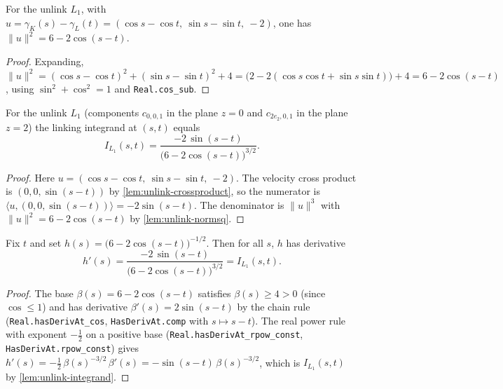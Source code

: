\begin{lemma}
    \label{lem:unlink-normsq}
    For the unlink $L_1$, with $u=\gamma_K(s)-\gamma_L(t)=(\cos s-\cos t,\ \sin
    s-\sin t,\ -2)$, one has $\lVert u\rVert^2 = 6 - 2\cos(s-t)$.
\end{lemma}
\begin{proof}
    Expanding, $\lVert u\rVert^2 = (\cos s-\cos t)^2 + (\sin s-\sin t)^2 + 4
    = \bigl(2 - 2(\cos s\cos t+\sin s\sin t)\bigr) + 4 = 6 - 2\cos(s-t)$, using
    $\sin^2+\cos^2=1$ and \texttt{Real.cos\_sub}.
\end{proof}

\begin{lemma}
    \label{lem:unlink-integrand}
    For the unlink $L_1$ (components $c_{0,0,1}$ in the plane $z=0$ and
    $c_{2e_2,0,1}$ in the plane $z=2$) the linking integrand at $(s,t)$ equals
    \[
        I_{L_1}(s,t) = \frac{-2\,\sin(s-t)}{\bigl(6 - 2\cos(s-t)\bigr)^{3/2}} .
    \]
\end{lemma}
\begin{proof}
    Here $u = (\cos s-\cos t,\ \sin s-\sin t,\ -2)$. The velocity cross product is
    $(0,0,\sin(s-t))$ by \cref{lem:unlink-crossproduct}, so the numerator is
    $\langle u,(0,0,\sin(s-t))\rangle = -2\sin(s-t)$. The denominator is
    $\lVert u\rVert^3$ with $\lVert u\rVert^2 = 6-2\cos(s-t)$ by
    \cref{lem:unlink-normsq}.
\end{proof}

\begin{lemma}
    \label{lem:unlink-antideriv}
    Fix $t$ and set $h(s) = \bigl(6-2\cos(s-t)\bigr)^{-1/2}$. Then for all $s$, $h$
    has derivative
    \[
        h'(s) = \frac{-2\,\sin(s-t)}{\bigl(6-2\cos(s-t)\bigr)^{3/2}} = I_{L_1}(s,t).
    \]
\end{lemma}
\begin{proof}
    The base $\beta(s)=6-2\cos(s-t)$ satisfies $\beta(s)\ge4>0$ (since
    $\cos\le1$) and has derivative $\beta'(s)=2\sin(s-t)$ by the chain rule
    (\texttt{Real.hasDerivAt\_cos}, \texttt{HasDerivAt.comp} with $s\mapsto s-t$).
    The real power rule with exponent $-\tfrac12$ on a positive base
    (\texttt{Real.hasDerivAt\_rpow\_const}, \texttt{HasDerivAt.rpow\_const}) gives
    $h'(s)=-\tfrac12\,\beta(s)^{-3/2}\,\beta'(s)
        =-\sin(s-t)\,\beta(s)^{-3/2}$, which is $I_{L_1}(s,t)$ by
    \cref{lem:unlink-integrand}.
\end{proof}

